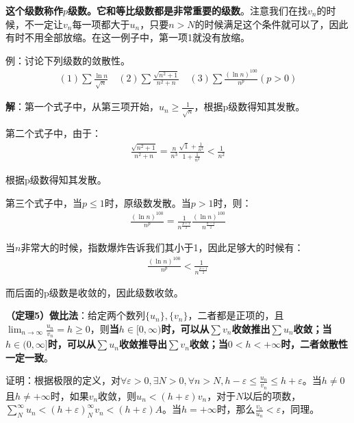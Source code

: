 \documentclass{ctexart}
\let\oldtextbf\textbf
\renewcommand{\textbf}[1]{\textcolor{brown!50!red}{\oldtextbf{#1}}}
\begin{document}
\textbf{\color{brown!50!red}这个级数称作$p$级数。它和等比级数都是非常重要的级数}。注意我们在找$v_n$的时候，不一定让$v_n$每一项都大于$u_n$，只要$n>N$的时候满足这个条件就可以了，因此有时不用全部放缩。在这一例子中，第一项1就没有放缩。

例：讨论下列级数的敛散性。
\begin{align*}
    (1)\sum\frac{\ln n}{\sqrt{n}}\quad(2)\sum \frac{\sqrt{n^2+1}}{n^2+n}\quad(3)\sum\frac{(\ln n)^{100}}{n^p}(p>0)
\end{align*}

\textbf{\color{brown!50!red}解}：第一个式子中，从第三项开始，$u_n\geq\frac{1}{\sqrt{n}}$，根据p级数得知其发散。

第二个式子中，由于：
\begin{align*}
    \frac{\sqrt{n^2+1}}{n^2+n}=\frac{n}{n^3}\frac{\sqrt{1}+\frac{1}{n^2}}{1+\frac{1}{n^2}}<\frac{1}{n^2}
\end{align*}

根据p级数得知其发散。

第三个式子中，当$p\leq 1$时，原级数发散。当$p>1$时，则：
\begin{align*}
   \frac{(\ln n)^{100}}{n^p}=\frac{1}{n^{\frac{p+1}{2}}}\frac{(\ln n)^{100}}{n^{\frac{n-1}{2}}}  
\end{align*}

当$n$非常大的时候，指数爆炸告诉我们其小于1，因此足够大的时候有：
\begin{align*}
   \frac{(\ln n)^{100}}{n^p}<\frac{1}{n^{\frac{p+1}{2}}} 
\end{align*}

而后面的p级数是收敛的，因此级数收敛。
\begin{tcolorbox}[
    colback=bac2,     %
    colframe=fra2,   %
    coltitle=white,             %
    coltext=tex2,
    title=做比法,
    fonttitle=\bfseries,        %
arc=3mm,                     %
breakable
]
\textbf{\color{brown!50!red}（定理5）做比法}：给定两个数列$\{u_n\},\{v_n\}$，二者都是正项的，且$\lim_{n\to\infty}\frac{u_n}{v_n}=h\geq 0$，则\textbf{\color{brown!50!red}当$h\in[0,\infty)$时，可以从$\sum v_n$收敛推出$\sum u_n$收敛；当$h\in (0,\infty]$时，可以从$\sum u_n$收敛推导出$\sum v_n$收敛；当$0<h<+\infty$时，二者敛散性一定一致}。
\end{tcolorbox}

证明：根据极限的定义，对$\forall \varepsilon>0,\exists N>0,\forall n>N,h-\varepsilon\leq\frac{u_n}{v_n}\leq h+\varepsilon$。当$h\neq 0$且$h\neq +\infty$时，如果$v_n$收敛，则$u_n<(h+\varepsilon)v_n$，对于$N$以后的项数，$\sum_N^\infty u_n<(h+\varepsilon)_N^\infty v_n<(h+\varepsilon) A$。当$h=+\infty$时，那么$\frac{v_n}{u_n}<\varepsilon$，同理。
\end{document}
